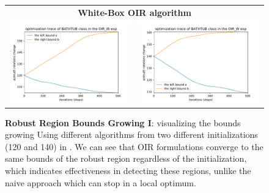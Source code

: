 \begin{figure}[h]
\begin{tabular}{c|c}
\multicolumn{2}{c}{\textbf{White-Box OIR algorithm}} \\  
\includegraphics[width = 9cm]{supimages/converge/run0_1_1_OIR_W.pdf} &
\includegraphics[width = 9cm]{supimages/converge/run1_1_1_OIR_W.pdf} \\   \hline
\end{tabular}
   \caption{\small \textbf{Robust Region Bounds Growing I}: visualizing the bounds growing Using different algorithms from two different initializations (120 and 140) in \figLabel{\ref{fig:converge}}. We can see that OIR formulations converge to the same bounds of the robust region regardless of the initialization, which indicates effectiveness in detecting these regions, unlike the naive approach which can stop in a local optimum. }
   \vspace{-8pt}
   \label{fig:conv1}
\end{figure}

